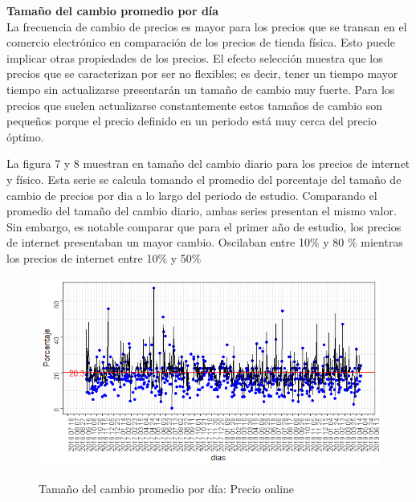 \documentclass[12pt,a4paper,pdflatex]{article}
\begin{document}
\clearpage

\textbf{Tamaño del cambio promedio por día} \\

La frecuencia de cambio de precios es mayor para los precios que se transan en el comercio electrónico en comparación de los precios de tienda física. Esto puede implicar otras propiedades de los precios. El efecto selección muestra que los precios que se caracterizan por ser no flexibles; es decir, tener un tiempo mayor tiempo sin actualizarse presentarán un tamaño de cambio muy fuerte. Para los precios que suelen actualizarse constantemente estos tamaños de cambio son pequeños porque el precio definido en un periodo está muy cerca del precio óptimo.

La figura 7 y 8 muestran en tamaño del cambio diario para los precios de internet y físico. Esta serie se calcula tomando el promedio del porcentaje del tamaño de cambio de precios por dia a lo largo del periodo de estudio. Comparando el promedio del tamaño del cambio diario, ambas series presentan el mismo valor. Sin embargo, es notable comparar que para el primer año de estudio, los precios de internet presentaban un mayor cambio. Oscilaban entre 10\% y 80 \% mientras los precios de internet entre 10\% y 50\%

\begin{figure}[!ht]
\centering
 \caption{Tamaño del cambio promedio por d\'ia: Precio online}
\includegraphics[scale=1.0]{tamano_cambio_promedio_internet.png}
  \label{fig:Tamaño del cambio promedio por d\'ia: Precio online}
\end{figure}
\end{document}
